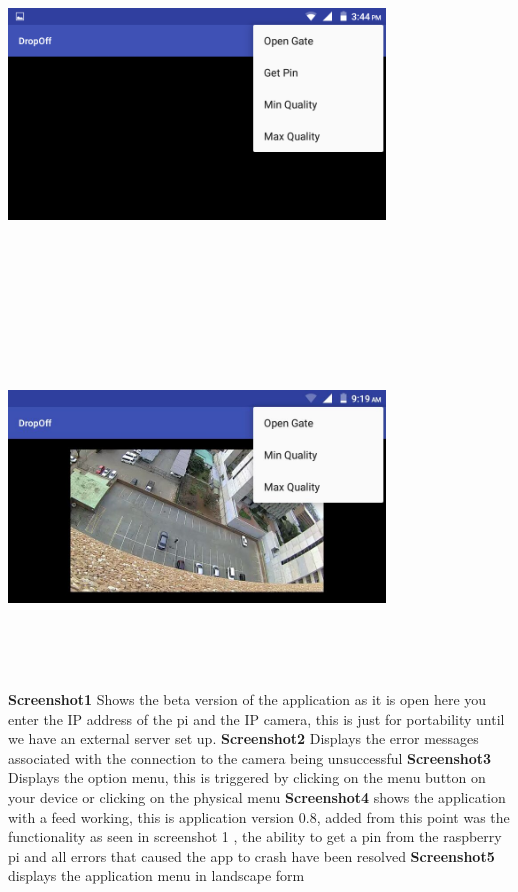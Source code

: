 \documentclass[a4paper,12pt]{article}
\begin{document}
			\includegraphics[width=10cm,height=10cm,keepaspectratio]{./Pictures/a4.png}
			\includegraphics[width=10cm,height=10cm,keepaspectratio]{./Pictures/a5.jpg}\\ \newline
			\textbf{Screenshot1} Shows the beta version of the application as it is open here you enter the IP address of the pi and the IP camera, this is just for portability until we have an external server set up.\newline
			\textbf{Screenshot2} Displays the error messages associated with the connection to the camera being unsuccessful\newline
			\textbf{Screenshot3} Displays the option menu, this is triggered by clicking on the menu button on your device or clicking on the physical menu\newline
			\textbf{Screenshot4} shows the application with a feed working, this is application version 0.8, added from this point was the functionality as seen in screenshot 1 , the ability to get a pin from the raspberry pi and all errors that caused the app to crash have been resolved\newline 
			\textbf{Screenshot5} displays the application menu in landscape form\newline
			
\end{document}
